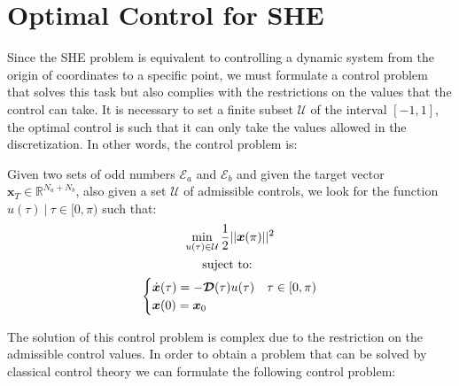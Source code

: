 \section{Optimal Control for SHE}\label{Section4}

Since the SHE problem is equivalent to controlling a dynamic system from the origin of coordinates to a specific point, we must formulate a control problem that solves this task but also complies with the restrictions on the values that the control can take. It is necessary to set a finite subset $ \mathcal {U} $ of the interval $ [- 1,1] $, the optimal control is such that it can only take the values allowed in the discretization. In other words, the control problem is:
\begin{problem}\label{OCP1}
    Given two sets of odd numbers $ \mathcal {E} _a $ and $ \mathcal {E} _b $ and given the target vector $ \bm {x} _T \in \mathbb {R} ^ {N_a + N_b} $, also given a set $ \mathcal {U} $ of admissible controls, we look for the function $ u (\tau) \ | \ \tau \in [0, \pi) $ such that:
    \begin{gather}
        \min_{u(\tau) \in \mathcal{U}}         
         \frac{1}{2}|| \bm{x}(\pi)  ||^2   \\
        \notag \text{suject to: } \\
        \begin{cases}
            \dot{\bm{x}}(\tau) = -\bm{\mathcal{D}}(\tau) u(\tau)  & \tau \in [0,\pi)\\
            \bm{x}(0) = \bm{x}_0
        \end{cases}
    \end{gather}
\end{problem}
%
The solution of this control problem is complex due to the restriction on the admissible control values.
%
In order to obtain a problem that can be solved by classical control theory we can formulate the following control problem:

